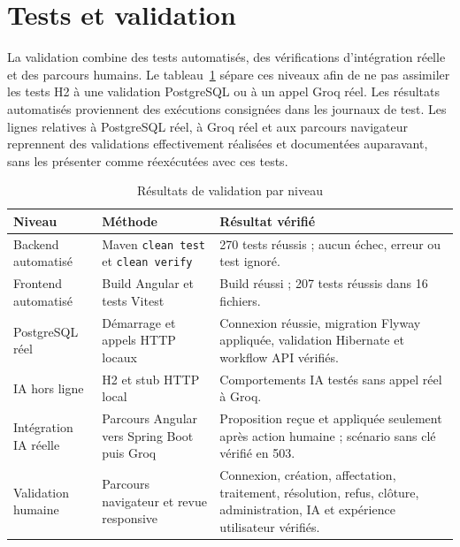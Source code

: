 \section{Tests et validation}
\label{sec:03-tests}

La validation combine des tests automatisés, des vérifications d'intégration réelle et des parcours humains. Le tableau~\ref{tab:03-validation} sépare ces niveaux afin de ne pas assimiler les tests H2 à une validation PostgreSQL ou à un appel Groq réel. Les résultats automatisés proviennent des exécutions consignées dans les journaux de test. Les lignes relatives à PostgreSQL réel, à Groq réel et aux parcours navigateur reprennent des validations effectivement réalisées et documentées auparavant, sans les présenter comme réexécutées avec ces tests.

\begin{table}[htbp]
\centering
\small
\caption{Résultats de validation par niveau}
\label{tab:03-validation}
\begingroup
\setlength{\tabcolsep}{4pt}
\setlength{\arrayrulewidth}{0.3pt}
\renewcommand{\arraystretch}{1.12}
\newcommand{\VCell}[1]{{\raggedright #1\par}}
\begin{tabular}{@{}p{}p{}p{}@{}}
\hline
\VCell{\textbf{Niveau}} & \VCell{\textbf{Méthode}} & \VCell{\textbf{Résultat vérifié}}\\ \hline
\VCell{Backend automatisé} & \VCell{Maven \texttt{clean test} et \texttt{clean verify}} & \VCell{270 tests réussis ; aucun échec, erreur ou test ignoré.}\\ \hline
\VCell{Frontend automatisé} & \VCell{Build Angular et tests Vitest} & \VCell{Build réussi ; 207 tests réussis dans 16 fichiers.}\\ \hline
\VCell{PostgreSQL réel} & \VCell{Démarrage et appels HTTP locaux} & \VCell{Connexion réussie, migration Flyway appliquée, validation Hibernate et workflow API vérifiés.}\\ \hline
\VCell{IA hors ligne} & \VCell{H2 et stub HTTP local} & \VCell{Comportements IA testés sans appel réel à Groq.}\\ \hline
\VCell{Intégration IA réelle} & \VCell{Parcours Angular vers Spring Boot puis Groq} & \VCell{Proposition reçue et appliquée seulement après action humaine ; scénario sans clé vérifié en 503.}\\ \hline
\VCell{Validation humaine} & \VCell{Parcours navigateur et revue responsive} & \VCell{Connexion, création, affectation, traitement, résolution, refus, clôture, administration, IA et expérience utilisateur vérifiés.}\\ \hline
\end{tabular}
\endgroup
\end{table}
\FloatBarrier

